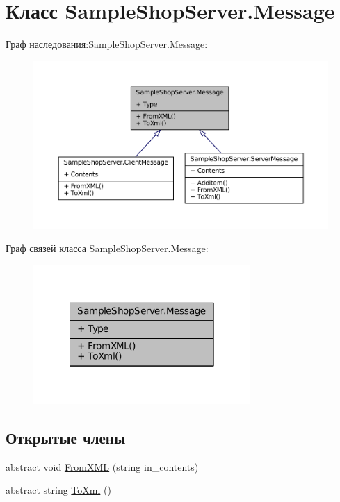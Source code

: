 \hypertarget{class_sample_shop_server_1_1_message}{}\section{Класс Sample\+Shop\+Server.\+Message}
\label{class_sample_shop_server_1_1_message}


Граф наследования\+:Sample\+Shop\+Server.\+Message\+:
\nopagebreak
\begin{figure}[H]
\begin{center}
\leavevmode
\includegraphics[width=350pt]{class_sample_shop_server_1_1_message__inherit__graph}
\end{center}
\end{figure}


Граф связей класса Sample\+Shop\+Server.\+Message\+:
\nopagebreak
\begin{figure}[H]
\begin{center}
\leavevmode
\includegraphics[width=234pt]{class_sample_shop_server_1_1_message__coll__graph}
\end{center}
\end{figure}
\subsection*{Открытые члены}
\begin{DoxyCompactItemize}
\item 
abstract void \hyperlink{class_sample_shop_server_1_1_message_a984b61c47da9e09ba68396157e9eafe0}{From\+X\+M\+L} (string in\+\_\+contents)
\item 
abstract string \hyperlink{class_sample_shop_server_1_1_message_aff3ebefdc919f68c09fa9e0ee4834af2}{To\+Xml} ()
\end{DoxyCompactItemize}
